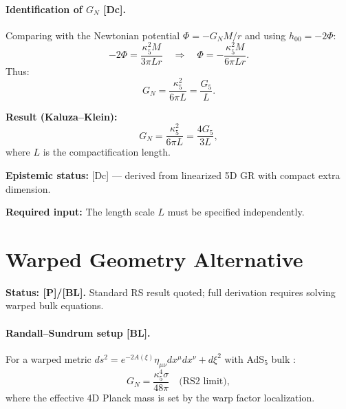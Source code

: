 \documentclass[11pt,a4paper]{article}
\newcommand{\tagBL}{\textcolor{blue!70!black}{[BL]}}
\newcommand{\tagP}{\textcolor{orange!80!black}{[P]}}
\newcommand{\tagDc}{\textcolor{purple!70!black}{[Dc]}}
\begin{document}
\paragraph{Identification of $G_N$ \tagDc{}.}
Comparing with the Newtonian potential $\Phi = -G_N M / r$ and using $h_{00} = -2\Phi$:
\begin{equation}
    -2\Phi = \frac{\kappa_5^2 M}{3\pi L r} \quad \Rightarrow \quad \Phi = -\frac{\kappa_5^2 M}{6\pi L r}.
\end{equation}
Thus:
\begin{equation}
    \boxed{G_N = \frac{\kappa_5^2}{6\pi L} = \frac{G_5}{L}.}
    \label{eq:GN_result}
\end{equation}

\begin{resultbox}
\textbf{Result (Kaluza--Klein):}
\begin{equation}
    G_N = \frac{\kappa_5^2}{6\pi L} = \frac{4G_5}{3L},
\end{equation}
where $L$ is the compactification length.

\textbf{Epistemic status:} \tagDc{} — derived from linearized 5D GR with compact extra dimension.

\textbf{Required input:} The length scale $L$ must be specified independently.
\end{resultbox}

\section{Warped Geometry Alternative}
\label{sec:warped}

\begin{statusbox}
\textbf{Status: \tagP{}/\tagBL{}.}
Standard RS result quoted; full derivation requires solving warped bulk equations.
\end{statusbox}

\paragraph{Randall--Sundrum setup \tagBL{}.}
For a warped metric $ds^2 = e^{-2A(\xi)} \eta_{\mu\nu} dx^\mu dx^\nu + d\xi^2$ with AdS$_5$ bulk \cite{RS1999}:
\begin{equation}
    G_N = \frac{\kappa_5^4 \sigma}{48\pi} \quad \text{(RS2 limit)},
    \label{eq:GN_RS}
\end{equation}
where the effective 4D Planck mass is set by the warp factor localization.
\end{document}
